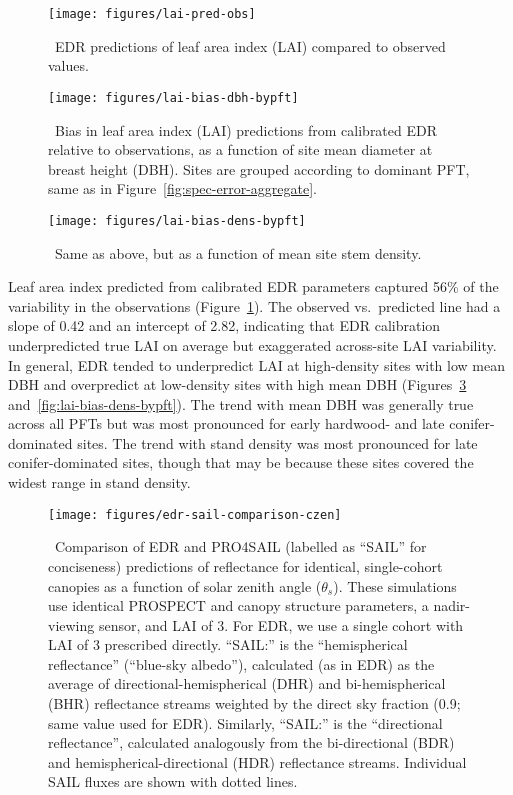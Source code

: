 \begin{figure}
  \centering
  \texttt{[image: figures/lai-pred-obs]}
  \caption{\
    EDR predictions of leaf area index (LAI) compared to observed values.
  }\label{fig:lai-pred-obs}
\end{figure}

\begin{figure}
  \centering
  \texttt{[image: figures/lai-bias-dbh-bypft]}
  \caption{\
    Bias in leaf area index (LAI) predictions from calibrated EDR relative to observations,
    as a function of site mean diameter at breast height (DBH).
    Sites are grouped according to dominant PFT, same as in Figure~\ref{fig:spec-error-aggregate}.
  }\label{fig:lai-bias-dbh-bypft}
\end{figure}

\begin{figure}
  \centering
  \texttt{[image: figures/lai-bias-dens-bypft]}
  \caption{\
    Same as above, but as a function of mean site stem density.
  }\label{fig:lai-bias-dbh-bypft}
\end{figure}

Leaf area index predicted from calibrated EDR parameters captured 56\% of the variability in the observations (Figure~\ref{fig:lai-pred-obs}).
The observed vs.\ predicted line had a slope of 0.42 and an intercept of 2.82, indicating that EDR calibration underpredicted true LAI on average but exaggerated across-site LAI variability.
In general, EDR tended to underpredict LAI at high-density sites with low mean DBH and overpredict at low-density sites with high mean DBH (Figures~\ref{fig:lai-bias-dbh-bypft} and~\ref{fig:lai-bias-dens-bypft}).
The trend with mean DBH was generally true across all PFTs but was most pronounced for early hardwood- and late conifer-dominated sites.
The trend with stand density was most pronounced for late conifer-dominated sites, though that may be because these sites covered the widest range in stand density.

\begin{figure}
  \centering
  \texttt{[image: figures/edr-sail-comparison-czen]}
  \caption{\label{fig:edr-sail-comparison-czen}\
    Comparison of EDR and PRO4SAIL (labelled as ``SAIL'' for conciseness) predictions of reflectance for identical, single-cohort canopies as a function of solar zenith angle ($\theta_{s}$).
    These simulations use identical PROSPECT and canopy structure parameters, a nadir-viewing sensor, and LAI of 3.
    For EDR, we use a single cohort with LAI of 3 prescribed directly.\@
    ``SAIL:\@HR'' is the ``hemispherical reflectance'' (``blue-sky albedo''), calculated (as in EDR) as the average of directional-hemispherical (DHR) and bi-hemispherical (BHR) reflectance streams weighted by the direct sky fraction (0.9; same value used for EDR).
    Similarly, ``SAIL:\@DR'' is the ``directional reflectance'', calculated analogously from the bi-directional (BDR) and hemispherical-directional (HDR) reflectance streams.
    Individual SAIL fluxes are shown with dotted lines.
  }
\end{figure}

